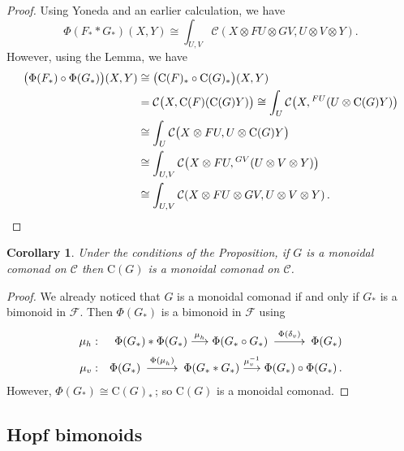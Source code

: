 \documentclass[a4paper,12pt]{article}
\makeatletter
\newtheorem*{Corollary}{Corollary}%
\theoremstyle{definition}
\theoremstyle{fact}
\theoremstyle{genquest}
\theoremstyle{step}
\newcommand{\catC}{\mathcal{C}}
\newcommand{\funcC}{\mathrm{C}}
\newcommand{\catF}{\mathcal{F}}
\newcommand{\longto}{\longrightarrow}
\newcommand{\xylongto}[2][2pt]{{\UseTips{}\xymatrix @C+#1{ \ar[r]^{#2}&}}}
\makeatother
\begin{document}
\begin{proof} 
Using Yoneda and an earlier calculation, we have
\[
\Phi (F_\ast \ast G_\ast) (X,Y) \cong \int_{U,V} \catC (X \otimes FU \otimes GV, U\otimes V \otimes Y).
\]
However, using the Lemma, we have
\begin{align*}
 \bigl(\Phi(F_\ast)\circ \Phi(G_\ast)\bigr) (X,Y) &\cong \bigl(\funcC(F)_\ast \circ \funcC (G)_\ast\bigr)(X,Y)
\\
&= \catC \bigl(X,\funcC(F)(\funcC(G)Y)\bigr) 
  \cong \int_U \catC \bigl(X, {}^{FU}(U\otimes \funcC(G)Y)\bigr)
\\
&\cong 
\int_U \catC \bigl(X \otimes FU, U\otimes \funcC (G) Y\bigr) 
\\
& \cong \int_{U,V} \catC \bigl(X\otimes FU, {}^{GV}(U\otimes V \otimes Y)\bigr)
\\
&\cong \int_{U,V} \catC (X\otimes FU \otimes GV, U\otimes V \otimes Y)\,.  \qedhere
\end{align*}
\end{proof}

\begin{Corollary} 
Under the conditions of the Proposition, 
if $G$ is a monoidal comonad on $\catC$ then $\funcC (G)$ is a monoidal comonad on $\catC$.
\end{Corollary}

\begin{proof} 
We already noticed that $G$ is a monoidal comonad if and only if $G_\ast$ is a bimonoid in $\catF$.   
Then $\Phi(G_\ast)$ is a bimonoid in $\catF$ using
\begin{eqnarray*}
\mu_h       &:&   \Phi (G_\ast) \ast \Phi (G_\ast) \stackrel{\mu^{}_h}{\longto} \Phi (G_\ast\circ G_\ast)
  \xylongto{\Phi(\delta_v)} %
   \Phi (G_\ast)
\\
\mu_v &:& \Phi(G_\ast) \xylongto{\Phi(\mu^{}_h)} %
 \Phi (G_\ast \ast G_\ast) 
 \stackrel{\mu^{-1}_v}{\longto} \Phi (G_\ast) \circ \Phi (G_\ast)\,.
\end{eqnarray*}
However, $\Phi (G_\ast) \cong \funcC (G)_\ast\,$; so $\funcC (G)$ is a monoidal comonad.
\end{proof}

\subsection{Hopf bimonoids}
\end{document}
